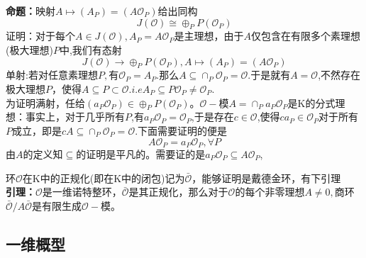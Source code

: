 \documentclass[UTF8]{article}
\begin{document}
    \textbf{命题：}映射$A\mapsto (A_{P})=(A\mathcal{O}_{P})$给出同构$$
    J(\mathcal{O})\cong \oplus_{P}P(\mathcal{O}_{P})
    $$
    证明：对于每个$A\in J(\mathcal{O}),A_{P}=A\mathcal{O}_{P}$是主理想，由于$A$仅包含在有限多个素理想(极大理想)$P$中,我们有态射$$
    J(\mathcal{O})\rightarrow \oplus_{P}P(\mathcal{O}_{P}),A\mapsto (A_{P})=(A\mathcal{O}_{P})
    $$
    单射:若对任意素理想$P,$有$\mathcal{O}_{P}=A_{P}$.那么$A\subseteq \cap_{P}\mathcal{O}_{P}=\mathcal{O}.$于是就有$A=\mathcal{O}$,不然存在极大理想$P$，使得$A\subseteq P\subset \mathcal{O}.i.e A_{P}\subseteq P\mathcal{O}_{P}\neq \mathcal{O}_{P}.$\\
    为证明满射，任给$(a_{P}\mathcal{O}_{P})\in \oplus_{P}P(\mathcal{O}_{P})$。$\mathcal{O}-$模$A=\cap_{P}a_{P}\mathcal{O}_{P}$是K的分式理想：事实上，对于几乎所有$P$,有$a_{P}\mathcal{O}_{P}=\mathcal{O}_{P}$,于是存在$c\in \mathcal{O}$,使得$ca_{P}\in \mathcal{O}_{P}$对于所有$P$成立，即是$cA\subseteq \cap _{P}\mathcal{O}_{P}=\mathcal{O}.$下面需要证明的便是$$
    A\mathcal{O}_{P}=a_{P}\mathcal{O}_{P},\forall P
    $$
    由$A$的定义知$\subseteq$的证明是平凡的。需要证的是$a_{P}\mathcal{O}_{P}\subseteq A\mathcal{O}_{P}$,
    
    
    环$\mathcal{O}$在K中的正规化(即在K中的闭包)记为$\bar{\mathcal{O}}，$能够证明是戴德金环，有下引理\\
    \textbf{引理：}$\mathcal{O}$是一维诺特整环，$\bar{\mathcal{O}}$是其正规化，那么对于$\mathcal{O}$的每个非零理想$A\neq 0,$商环$\bar{\mathcal{O}}/A\bar{\mathcal{O}}$是有限生成$\mathcal{O}-$模。
    \subsection{一维概型}   
\end{document}
